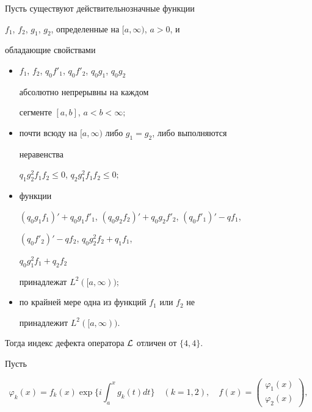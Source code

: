\begin{thm} 


Пусть существуют действительнозначные функции 


$f_1$, $f_2$, $g_1$, $g_2$, определенные на $[a,\infty)$, $a>0$, и 


обладающие свойствами 


\begin{itemize} 


\item[1)] $f_1$, $f_2$, $q_0f'_1$, $q_0f'_2$, $q_0g_1$, $q_0g_2$ 


абсолютно непрерывны на каждом 


сегменте $[a,b]$, $a<b<\infty;$ 


\item[2)] почти всюду на $[a,\infty)$ либо $g_1=g_2$, либо выполняются 


неравенства 


$q_1g^2_2f_1f_2\le0$, $q_2g^2_1f_1f_2\le0;$ 


\item[3)] функции 


$(q_0g_1f_1)'+q_0g_1f'_1$, $(q_0g_2f_2)'+ 


q_0g_2f'_2$, $(q_0f'_1)'-q f_1$, 


$(q_0f'_2)'-q f_2$, $q_0g^2_2f_2+q_1f_1$, 


$q_0g^2_1f_1+q_2f_2$ 


принадлежат $L^2([a,\infty));$ 


\item[4)] по крайней мере одна из функций $f_1$ или $f_2$ не 


принадлежит $L^2([a,\infty))$. 


\end{itemize} 


Тогда индекс дефекта оператора $\cal L$ отличен от $\{4,4\}$. 


\end{thm} 


 


Пусть 


\begin{equation} 


\varphi_k(x)=f_k(x)\exp\bigg\{i\int^x_a g_k(t)dt\bigg\} 


\quad (k=1,2),\quad f(x)= 


\begin{pmatrix} 


\varphi_1(x) \\ \varphi_2(x) 


\end{pmatrix} 


, 


\end{equation} 


